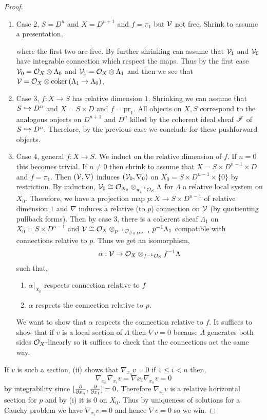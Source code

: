 \documentclass[12pt]{article}
\newcommand{\pr}{\mathrm{pr}}
\begin{document}
\begin{proof}
\begin{enumerate}
\item Case 2, $S = D^n$ and $X = D^{n+1}$ and $f = \pi_1$ but $\mathcal{V}$ not free. Shrink to assume a presentation,
\begin{center}
\end{center}
where the first two are free. By further shrinking can assume that $\mathcal{V}_1$ and $\mathcal{V}_0$ have integrable connection which respect the maps. Thus by the first case $\mathcal{V}_0 = \mathcal{O}_{X} \otimes \Lambda_0$ and $\mathcal{V}_1 = \mathcal{O}_{X} \otimes \Lambda_1$ and then we see that $\mathcal{V} = \mathcal{O}_{X} \otimes \operatorname{\mathrm{coker}}{(\Lambda_1 \to \Lambda_0)}$. 

\item Case 3, $f : X \to S$ has relative dimension $1$. Shrinking we can assume that $S \hookrightarrow D^n$ and $X = S \times D$ and $f = \pr_1$. All objects on $X, S$ correspond to the analogous onjects on $D^{n+1}$ and $D^n$ killed by the coherent ideal sheaf $\mathscr{I}$ of $S \hookrightarrow D^n$. Therefore, by the previous case we conclude for these pushforward objects.

\item Case 4, general $f : X \to S$. We induct on the relative dimension of $f$. If $n = 0$ this becomes trivial. If $n \neq 0$ then shrink to assume that $X = S \times D^{n-1} \times D$ and $f = \pi_1$. Then $(\mathcal{V}, \nabla)$ induces $(\mathcal{V}_0, \nabla_0)$ on $X_0 = S \times D^{n-1} \times \{ 0 \}$ by restriction. By induction, $\mathcal{V}_0 \cong \mathcal{O}_{X_0} \otimes_{\pi_1^{-1} \mathcal{O}_{S}} \Lambda$ for $\Lambda$ a relative local system on $X_0$. Therefore, we have a projection map $p : X \to S \times D^{n-1}$ of relative dimension $1$ and $\nabla$ induces a relative (to $p$) connection on $\mathcal{V}$ (by quotienting pullback forms). Then by case 3, there is a coherent sheaf $\Lambda_1$ on $X_0 = S \times D^{n-1}$ and $\mathcal{V} \cong \mathcal{O}_{X} \otimes_{p^{-1} \mathcal{O}_{S \times D^{n-1}}} p^{-1} \Lambda_1$ compatible with connections relative to $p$. Thus we get an isomorphism,
\[ \alpha : \mathcal{V} \to \mathcal{O}_{X} \otimes_{f^{-1} \mathcal{O}_{S}} f^{-1} \Lambda \]
such that,
\begin{enumerate}
\item $\alpha|_{X_0}$ respects connection relative to $f$ 
\item $\alpha$ respects the connection relative to $p$. 
\end{enumerate}
We want to show that $\alpha$ respects the connection relative to $f$. It suffices to show that if $v$ is a local section of $\Lambda$ then $\nabla v = 0$ because $\Lambda$ generates both sides $\mathcal{O}_{X}$-linearly so it suffices to check that the connections act the same way. 
\end{enumerate}
If $v$ is such a section, (ii) shows that $\nabla_{x_n} v = 0$ if $1 \le i < n$ then,
\[ \nabla_{x_n} \nabla_{x_i} v = \nabla x_i \nabla_{x_n} v = 0 \]
by integrability since $[\frac{\partial{}}{\partial{x_n}}, \frac{\partial{}}{\partial{x_1}}] = 0$. Therefore $\nabla_{x_i} v$ is a relative horizontal section for $p$ and by (i) it is $0$ on $X_0$. Thus by uniqueness of solutions for a Cauchy problem we have $\nabla_{x_i} v = 0$ and hence $\nabla v = 0$ so we win. 
\end{proof}
\end{document}

